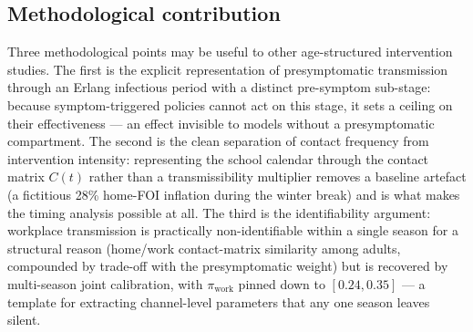 \documentclass[12pt]{article}
\theoremstyle{plain}
\theoremstyle{remark}
\theoremstyle{definition}
\begin{document}
\subsection{Methodological contribution}
Three methodological points may be useful to other age-structured intervention studies. The first is the explicit representation of presymptomatic transmission through an Erlang infectious period with a distinct pre-symptom sub-stage: because symptom-triggered policies cannot act on this stage, it sets a ceiling on their effectiveness --- an effect invisible to models without a presymptomatic compartment. The second is the clean separation of contact frequency from intervention intensity: representing the school calendar through the contact matrix $C(t)$ rather than a transmissibility multiplier removes a baseline artefact (a fictitious 28\% home-FOI inflation during the winter break) and is what makes the timing analysis possible at all. The third is the identifiability argument: workplace transmission is practically non-identifiable within a single season for a structural reason (home/work contact-matrix similarity among adults, compounded by trade-off with the presymptomatic weight) but is recovered by multi-season joint calibration, with $\pi_{\mathrm{work}}$ pinned down to $[0.24, 0.35]$ --- a template for extracting channel-level parameters that any one season leaves silent.
\end{document}
